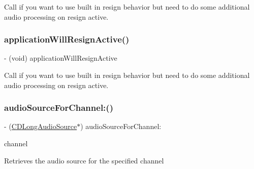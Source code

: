 Call if you want to use built in resign behavior but need to do some additional audio processing on resign active. \mbox{\label{interfaceCDAudioManager_a5265cc9a823688a547aa60e8995ba423}} 
\subsubsection{\texorpdfstring{application\+Will\+Resign\+Active()}{applicationWillResignActive()}\hspace{0.1cm}{\footnotesize\ttfamily [4/4]}}
{\footnotesize\ttfamily -\/ (void) application\+Will\+Resign\+Active \begin{DoxyParamCaption}{ }\end{DoxyParamCaption}}

Call if you want to use built in resign behavior but need to do some additional audio processing on resign active. \mbox{\label{interfaceCDAudioManager_a07f9dbc2d03a610a187675c6cfb24893}} 
\subsubsection{\texorpdfstring{audio\+Source\+For\+Channel\+:()}{audioSourceForChannel:()}\hspace{0.1cm}{\footnotesize\ttfamily [1/4]}}
{\footnotesize\ttfamily -\/ (\hyperlink{interfaceCDLongAudioSource}{C\+D\+Long\+Audio\+Source}$\ast$) audio\+Source\+For\+Channel\+: \begin{DoxyParamCaption}\item[{(t\+Audio\+Source\+Channel)}]{channel }\end{DoxyParamCaption}}

Retrieves the audio source for the specified channel \mbox{\label{interfaceCDAudioManager_a07f9dbc2d03a610a187675c6cfb24893}} 

